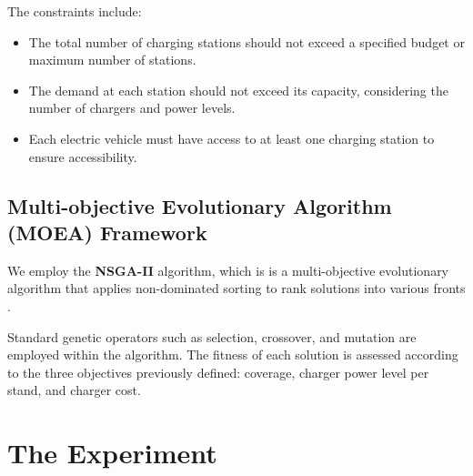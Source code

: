 \documentclass[12pt]{report}
\begin{document}
The constraints include:
\begin{itemize}
    \item The total number of charging stations should not exceed a specified budget or maximum number of stations.
    \item The demand at each station should not exceed its capacity, considering the number of chargers and power levels.
    \item Each electric vehicle must have access to at least one charging station to ensure accessibility.
\end{itemize}

\section{Multi-objective Evolutionary Algorithm (MOEA) Framework}
We employ the \textbf{NSGA-II} algorithm, which is  is a multi-objective evolutionary algorithm that applies non-dominated sorting to rank solutions into various fronts \cite{ref8}.

Standard genetic operators such as selection, crossover, and mutation are employed within the algorithm. The fitness of each solution is assessed according to the three objectives previously defined: coverage, charger power level per stand, and charger cost.

\chapter{The Experiment}
\end{document}
